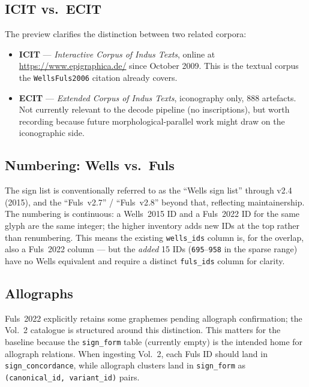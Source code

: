 \documentclass[12pt, a4paper]{article}
\newcommand{\sigid}[1]{\texttt{#1}}
\newcommand{\db}[1]{\texttt{#1}}
\begin{document}
\subsection{ICIT vs.\ ECIT}

The preview clarifies the distinction between two related
corpora:

\begin{itemize}[leftmargin=1.6em, itemsep=2pt]
\item \textbf{ICIT} --- \textit{Interactive Corpus of Indus
      Texts}, online at \url{https://www.epigraphica.de/}
      since October 2009.  This is the textual corpus the
      \texttt{WellsFuls2006} citation already covers.
\item \textbf{ECIT} --- \textit{Extended Corpus of Indus
      Texts}, iconography only, 888 artefacts.  Not currently
      relevant to the decode pipeline (no inscriptions), but
      worth recording because future morphological-parallel
      work might draw on the iconographic side.
\end{itemize}

\subsection{Numbering: Wells vs.\ Fuls}

The sign list is conventionally referred to as the ``Wells
sign list'' through v2.4 (2015), and the ``Fuls~v2.7'' /
``Fuls~v2.8'' beyond that, reflecting maintainership.
The numbering is continuous: a Wells~2015 ID and a Fuls~2022
ID for the same glyph are the same integer; the higher
inventory adds new IDs at the top rather than renumbering.
This means the existing \db{wells\_ids} column is, for the
overlap, also a Fuls~2022 column --- but the \emph{added} 15
IDs (\sigid{695}--\sigid{958} in the sparse range) have no
Wells equivalent and require a distinct \db{fuls\_ids}
column for clarity.

\subsection{Allographs}

Fuls~2022 explicitly retains some graphemes pending
allograph confirmation; the Vol.~2 catalogue is structured
around this distinction.  This matters for the baseline
because the \db{sign\_form} table (currently empty) is the
intended home for allograph relations.  When ingesting Vol.~2,
each Fuls ID should land in \db{sign\_concordance}, while
allograph clusters land in \db{sign\_form} as
\texttt{(canonical\_id, variant\_id)} pairs.
\end{document}
